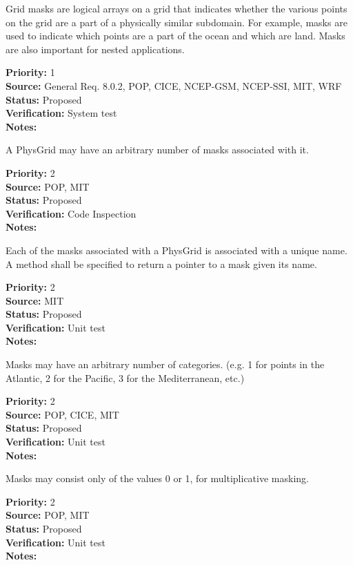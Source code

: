 Grid masks are logical arrays on a grid that indicates whether the various
points on the grid are a part of a physically similar subdomain. For example,
masks are used to indicate which points are a part of the ocean and which are
land.  Masks are also important for nested applications.

\begin{reqlist}
{\bf Priority:} 1 \\
{\bf Source:} General Req. 8.0.2, POP, CICE, NCEP-GSM, NCEP-SSI, MIT, WRF \\
{\bf Status:} Proposed \\
{\bf Verification:} System test\\
{\bf Notes:} 
\end{reqlist}

A PhysGrid may have an arbitrary number of masks associated with it.
\begin{reqlist}
{\bf Priority:} 2 \\
{\bf Source:} POP, MIT \\
{\bf Status:} Proposed \\
{\bf Verification:} Code Inspection\\
{\bf Notes:} 
\end{reqlist}

Each of the masks associated with a PhysGrid is associated with a
unique name.  A method shall be specified to return a pointer to a mask given
its name.
\begin{reqlist}
{\bf Priority:} 2 \\
{\bf Source:} MIT \\
{\bf Status:} Proposed \\
{\bf Verification:} Unit test\\
{\bf Notes:} 
\end{reqlist}

Masks may have an arbitrary number of categories. (e.g. 1 for points in the
Atlantic, 2 for the Pacific, 3 for the Mediterranean, etc.)
\begin{reqlist}
{\bf Priority:} 2 \\
{\bf Source:} POP, CICE, MIT \\
{\bf Status:} Proposed \\
{\bf Verification:} Unit test\\
{\bf Notes:} 
\end{reqlist}

Masks may consist only of the values 0 or 1, for multiplicative masking.
\begin{reqlist}
{\bf Priority:} 2 \\
{\bf Source:} POP, MIT \\
{\bf Status:} Proposed \\
{\bf Verification:} Unit test\\
{\bf Notes:} 
\end{reqlist}

